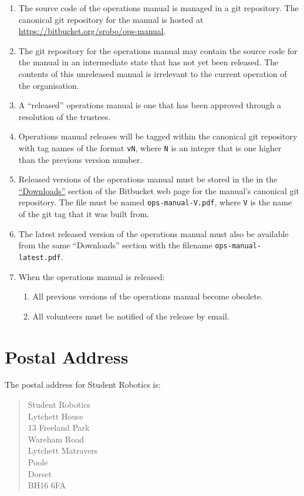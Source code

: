 \begin{enumerate}
\item The source code of the operations manual is managed in a git repository.  The canonical git repository for the manual is hosted at \url{https://bitbucket.org/srobo/ops-manual}.

\item The git repository for the operations manual may contain the source code for the manual in an intermediate state that has not yet been released.  The contents of this unreleased manual is irrelevant to the current operation of the organisation.

\item A ``released'' operations manual is one that has been approved through a resolution of the trustees.

\item Operations manual releases will be tagged within the canonical git repository with tag names of the format \texttt{vN}, where \texttt{N} is an integer that is one higher than the previous version number.

\item Released versions of the operations manual must be stored in the in the \href{https://bitbucket.org/srobo/ops-manual/downloads}{``Downloads''} section of the Bitbucket web page for the manual's canonical git repository.  The file must be named \texttt{ops-manual-V.pdf}, where \texttt{V} is the name of the git tag that it was built from.

\item The latest released version of the operations manual must also be available from the same ``Downloads'' section with the filename \texttt{ops-manual-latest.pdf}.

\item When the operations manual is released:
  \begin{enumerate}
  \item All previous versions of the operations manual become obsolete.
  \item All volunteers must be notified of the release by email.
  \end{enumerate}
\end{enumerate}

\section{Postal Address}

The postal address for Student Robotics is:
\begin{quote}
    Student Robotics \\
    Lytchett House \\
    13 Freeland Park \\
    Wareham Road \\
    Lytchett Matravers \\
    Poole \\
    Dorset \\
    BH16 6FA \\ 
\end{quote}
